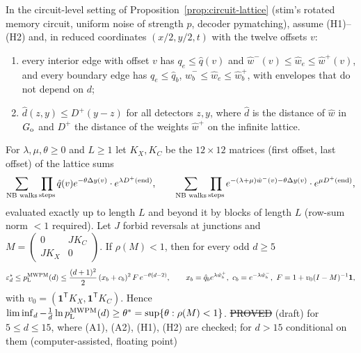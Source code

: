 \begin{proposition}\label{prop:gap-lattice}
In the circuit-level setting of Proposition~\ref{prop:circuit-lattice} (stim's rotated memory circuit, uniform noise of strength $p$, decoder pymatching), assume (H1)--(H2) and, in reduced coordinates $(x/2,y/2,t)$ with the twelve offsets $v$:
\begin{enumerate}[(A1)]
\item every interior edge with offset $v$ has $q_e\le\hat q(v)$ and $\hat w^-(v)\le\hat w_e\le\hat w^+(v)$, and every boundary edge has $q_e\le\hat q_b$, $\hat w_b^-\le\hat w_e\le\hat w_b^+$, with envelopes that do not depend on $d$;
\item $\hat d(z,y)\le D^+(y-z)$ for all detectors $z,y$, where $\hat d$ is the distance of $\hat w$ in $G_{\rm o}$ and $D^+$ the distance of the weights $\hat w^+$ on the infinite lattice.
\end{enumerate}
For $\lambda,\mu,\theta\ge0$ and $L\ge1$ let $K_X,K_C$ be the $12\times12$ matrices (first offset, last offset) of the lattice sums
\[
\sum_{\text{NB walks}}\prod_{\rm steps}\hat q(v)e^{-\theta\Delta y(v)}\cdot e^{\lambda D^+(\mathrm{end})},\qquad
\sum_{\text{NB walks}}\prod_{\rm steps}e^{-(\lambda+\mu)\hat w^-(v)-\theta\Delta y(v)}\cdot e^{\mu D^+(\mathrm{end})},
\]
evaluated exactly up to length $L$ and beyond it by blocks of length $L$ (row-sum norm $<1$ required). Let $J$ forbid reversals at junctions and $M=\begin{pmatrix}0&JK_C\\JK_X&0\end{pmatrix}$. If $\rho(M)<1$, then for every odd $d\ge5$
\[
\err_d\le\pL^{\rm MWPM}(d)\le\frac{(d+1)^2}{2}\,(x_b+c_b)^2\,F\,e^{-\theta(d-2)},\qquad x_b=\hat q_be^{\lambda\hat w_b^+},\ c_b=e^{-\lambda\hat w_b^-},\ F=1+v_0(I-M)^{-1}\mathbf 1,
\]
with $v_0=(\mathbf 1^{\mathsf T}K_X,\mathbf 1^{\mathsf T}K_C)$. Hence $\liminf_d-\tfrac1d\ln p_{\mathrm{L}}^{\rm MWPM}(d)\ge\theta^\ast=\sup\{\theta:\rho(M)<1\}$.
\hfill\st{PROVED} (draft) for $5\le d\le15$, where (A1), (A2), (H1), (H2) are checked; for $d>15$ conditional on them (computer-assisted, floating point)
\end{proposition}
